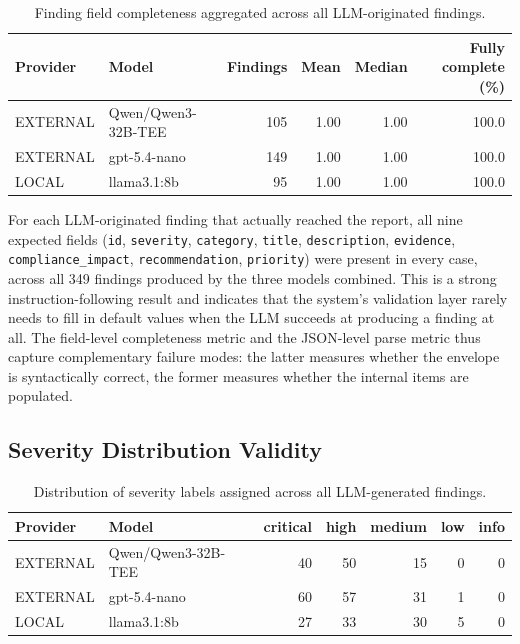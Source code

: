 \documentclass[]{UCD_CS_FYP_Report}
\begin{document}
\begin{table}[!ht]
    \centering
    {\footnotesize
        \begin{tabular}{|l|l|r|r|r|r|}
        \hline
            \textbf{Provider} & \textbf{Model} & \textbf{Findings} & \textbf{Mean} & \textbf{Median} & \textbf{Fully complete (\%)} \\ \hline
            EXTERNAL & Qwen/Qwen3-32B-TEE & 105 & 1.00 & 1.00 & 100.0 \\ \hline
            EXTERNAL & gpt-5.4-nano       & 149 & 1.00 & 1.00 & 100.0 \\ \hline
            LOCAL    & llama3.1:8b        &  95 & 1.00 & 1.00 & 100.0 \\ \hline
        \end{tabular}
    }
    \caption{Finding field completeness aggregated across all LLM-originated findings.}
    \label{tab:finding_completeness}
\end{table}
 
For each LLM-originated finding that actually reached the report, all nine expected fields (\texttt{id}, \texttt{severity}, \texttt{category}, \texttt{title}, \texttt{description}, \texttt{evidence}, \texttt{compliance\_impact}, \texttt{recommendation}, \texttt{priority}) were present in every case, across all 349 findings produced by the three models combined. This is a strong instruction-following result and indicates that the system's validation layer rarely needs to fill in default values when the LLM succeeds at producing a finding at all. The field-level completeness metric and the JSON-level parse metric thus capture complementary failure modes: the latter measures whether the envelope is syntactically correct, the former measures whether the internal items are populated.
 
\subsection{Severity Distribution Validity}
 
\begin{table}[!ht]
    \centering
    {\footnotesize
        \begin{tabular}{|l|l|r|r|r|r|r|}
        \hline
            \textbf{Provider} & \textbf{Model} & \textbf{critical} & \textbf{high} & \textbf{medium} & \textbf{low} & \textbf{info} \\ \hline
            EXTERNAL & Qwen/Qwen3-32B-TEE & 40 & 50 & 15 & 0 & 0 \\ \hline
            EXTERNAL & gpt-5.4-nano       & 60 & 57 & 31 & 1 & 0 \\ \hline
            LOCAL    & llama3.1:8b        & 27 & 33 & 30 & 5 & 0 \\ \hline
        \end{tabular}
    }
    \caption{Distribution of severity labels assigned across all LLM-generated findings.}
    \label{tab:severity_distribution}
\end{table}
 
\end{document}
